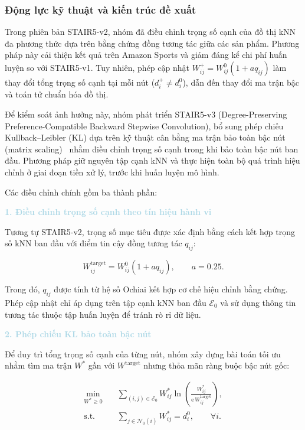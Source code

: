 \subsubsection{Động lực kỹ thuật và kiến trúc đề xuất}

Trong phiên bản STAIR5-v2, nhóm đã điều chỉnh trọng số cạnh của đồ thị kNN đa phương thức dựa trên bằng chứng đồng tương tác giữa các sản phẩm. Phương pháp này cải thiện kết quả trên Amazon Sports và giảm đáng kể chi phí huấn luyện so với STAIR5-v1. Tuy nhiên, phép cập nhật $W_{ij}^{+}=W_{ij}^{0}(1+a q_{ij})$ làm thay đổi tổng trọng số cạnh tại mỗi nút ($d_i^{+}\neq d_i^{0}$), dẫn đến thay đổi ma trận bậc và toán tử chuẩn hóa đồ thị.

Để kiểm soát ảnh hưởng này, nhóm phát triển STAIR5-v3 (Degree-Preserving Preference-Compatible Backward Stepwise Convolution), bổ sung phép chiếu Kullback--Leibler (KL) dựa trên kỹ thuật cân bằng ma trận bảo toàn bậc nút (matrix scaling)~\cite{idel2016matrix} nhằm điều chỉnh trọng số cạnh trong khi bảo toàn bậc nút ban đầu. Phương pháp giữ nguyên tập cạnh kNN và thực hiện toàn bộ quá trình hiệu chỉnh ở giai đoạn tiền xử lý, trước khi huấn luyện mô hình.

Các điều chỉnh chính gồm ba thành phần:

\noindent\textcolor{lightblue}{\textbf{1. Điều chỉnh trọng số cạnh theo tín hiệu hành vi}}

Tương tự STAIR5-v2, trọng số mục tiêu được xác định bằng cách kết hợp trọng số kNN ban đầu với điểm tin cậy đồng tương tác $q_{ij}$:

\begin{equation}
W_{ij}^{\mathrm{target}}=W_{ij}^{0}(1+a q_{ij}), \qquad a=0.25.
\end{equation}

Trong đó, $q_{ij}$ được tính từ hệ số Ochiai kết hợp cơ chế hiệu chỉnh bằng chứng. Phép cập nhật chỉ áp dụng trên tập cạnh kNN ban đầu $\mathcal{E}_0$ và sử dụng thông tin tương tác thuộc tập huấn luyện để tránh rò rỉ dữ liệu.

\noindent\textcolor{lightblue}{\textbf{2. Phép chiếu KL bảo toàn bậc nút}}

Để duy trì tổng trọng số cạnh của từng nút, nhóm xây dựng bài toán tối ưu nhằm tìm ma trận $W^{*}$ gần với $W^{\mathrm{target}}$ nhưng thỏa mãn ràng buộc bậc nút gốc:

\begin{equation}
\begin{aligned}
\min_{W^{*}\geq 0}\quad &
\sum_{(i,j)\in\mathcal{E}_0}
W_{ij}^{*}
\ln\left(
\frac{W_{ij}^{*}}
{\mathrm{e}\,W_{ij}^{\mathrm{target}}}
\right),\\
\text{s.t.}\quad &
\sum_{j\in\mathcal{N}_0(i)}W_{ij}^{*}=d_i^{0},
\qquad \forall i.
\end{aligned}
\end{equation}

